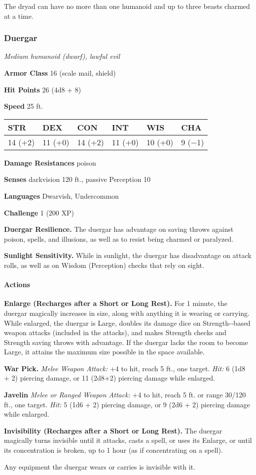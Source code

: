 \documentclass[
]{article}
\begin{document}
The dryad can have no more than one humanoid and up to three beasts
charmed at a time.

\hypertarget{duergar}{%
\subsubsection{Duergar}\label{duergar}}

\emph{Medium humanoid (dwarf), lawful evil}

\textbf{Armor Class} 16 (scale mail, shield)

\textbf{Hit Points} 26 (4d8 + 8)

\textbf{Speed} 25 ft.

\begin{longtable}[]{@{}llllll@{}}
\toprule
STR & DEX & CON & INT & WIS & CHA\tabularnewline
\midrule
\endhead
14 (+2) & 11 (+0) & 14 (+2) & 11 (+0) & 10 (+0) & 9 (−1)\tabularnewline
\bottomrule
\end{longtable}

\textbf{Damage Resistances} poison

\textbf{Senses} darkvision 120 ft., passive Perception 10

\textbf{Languages} Dwarvish, Undercommon

\textbf{Challenge} 1 (200 XP)

\textbf{Duergar Resilience.} The duergar has advantage on saving throws
against poison, spells, and illusions, as well as to resist being
charmed or paralyzed.

\textbf{Sunlight Sensitivity.} While in sunlight, the duergar has
disadvantage on attack rolls, as well as on Wisdom (Perception) checks
that rely on sight.

\hypertarget{actions-66}{%
\paragraph{Actions}\label{actions-66}}

\textbf{Enlarge (Recharges after a Short or Long Rest).} For 1 minute,
the duergar magically increases in size, along with anything it is
wearing or carrying. While enlarged, the duergar is Large, doubles its
damage dice on Strength-­‐based weapon attacks (included in the
attacks), and makes Strength checks and Strength saving throws with
advantage. If the duergar lacks the room to become Large, it attains the
maximum size possible in the space available.

\textbf{War Pick.} \emph{Melee Weapon Attack:} +4 to hit, reach 5 ft.,
one target. \emph{Hit:} 6 (1d8 + 2) piercing damage, or 11 (2d8+2)
piercing damage while enlarged.

\textbf{Javelin} \emph{Melee or Ranged Weapon Attack:} +4 to hit, reach
5 ft. or range 30/120 ft., one target. \emph{Hit:} 5 (1d6 + 2) piercing
damage, or 9 (2d6 + 2) piercing damage while enlarged.

\textbf{Invisibility (Recharges after a Short or Long Rest).} The
duergar magically turns invisible until it attacks, casts a spell, or
uses its Enlarge, or until its concentration is broken, up to 1 hour (as
if concentrating on a spell).

Any equipment the duergar wears or carries is invisible with it.
\end{document}
